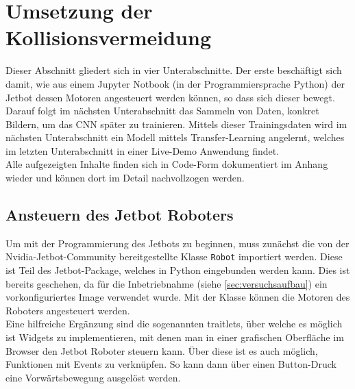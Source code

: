 \section{Umsetzung der Kollisionsvermeidung} \label{sec:durchführung}

Dieser Abschnitt gliedert sich in vier Unterabschnitte. Der erste beschäftigt sich damit, wie aus einem Jupyter Notbook (in der Programmiersprache Python) der Jetbot \bzw dessen Motoren angesteuert werden können, so dass sich dieser bewegt. Darauf folgt im nächsten Unterabschnitt das Sammeln von Daten, konkret Bildern, um das CNN später zu trainieren. Mittels dieser Trainingsdaten wird im nächsten Unterabschnitt ein Modell mittels Transfer-Learning angelernt, welches im letzten Unterabschnitt in einer Live-Demo Anwendung findet.\\

Alle aufgezeigten Inhalte finden sich in Code-Form dokumentiert im Anhang wieder und können dort im Detail nachvollzogen werden.

\subsection{Ansteuern des Jetbot Roboters} \label{sec:steuern-robot}

Um mit der Programmierung des Jetbots zu beginnen, muss zunächst die von der Nvidia-Jetbot-Community bereitgestellte Klasse \glqq\texttt{Robot}\grqq{} importiert werden. Diese ist Teil des Jetbot-Package, welches in Python eingebunden werden kann. Dies ist bereits geschehen, da für die Inbetriebnahme (siehe \autoref{sec:versuchsaufbau}) ein vorkonfiguriertes Image verwendet wurde. Mit der Klasse können die Motoren des Roboters angesteuert werden. \\
Eine hilfreiche Ergänzung sind die sogenannten \glqq traitlets\grqq{}, über welche es möglich ist Widgets zu implementieren, mit denen man in einer grafischen Oberfläche im Browser den Jetbot Roboter steuern kann. Über diese ist es auch möglich, Funktionen mit Events zu verknüpfen. So kann dann \zB über einen Button-Druck eine Vorwärtsbewegung ausgelöst werden.\\

